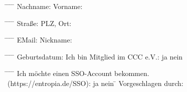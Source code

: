 \documentclass{scrartcl}
\begin{document}
\begin{tabbing}
\hspace*{3cm}\= \hspace*{6cm} \= \hspace*{2cm} \= \hspace*{4cm} \= \kill
Nachname: \> \underline{\hspace{150pt}} \> Vorname: \>  \underline{\hspace{150pt}}
\end{tabbing}
\begin{tabbing}
\hspace*{3cm}\= \hspace*{6cm} \= \hspace*{2cm} \= \hspace*{4cm} \= \kill
Stra{\ss}e: \> \underline{\hspace{150pt}} \> PLZ, Ort: \> \underline{\hspace{150pt}}
\end{tabbing}
\begin{tabbing}
\hspace*{3cm}\= \hspace*{6cm} \= \hspace*{2cm} \= \hspace*{4cm} \= \kill
EMail: \> \underline{\hspace{150pt}} \> Nickname: \> \underline{\hspace{150pt}}
\end{tabbing}
\begin{tabbing}
\hspace*{3cm}\= \hspace*{6cm} \= \hspace*{2cm} \= \hspace*{4cm} \= \kill
Geburtsdatum: \> \underline{\hspace{150pt}} \> Ich bin Mitglied im CCC e.V.:  \Square ja \Square nein
\end{tabbing}
\begin{tabbing}
\hspace*{3cm}\= \hspace*{6cm} \= \hspace*{2cm} \= \hspace*{4cm} \= \kill
Ich möchte einen SSO-Account bekommen.
\\
(https://entropia.de/SSO): \Square ja \Square nein  \hspace*{4cm} \= \hspace*{4cm} \> Vorgeschlagen durch: \underline{\hspace{102pt}}
\end{tabbing}
\end{document}
